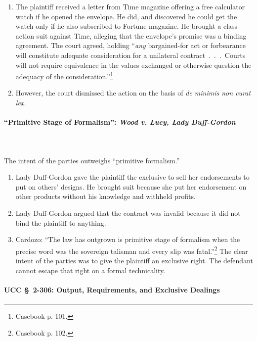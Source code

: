 \begin{enumerate}
    \item The plaintiff received a letter from Time magazine offering a free 
    calculator watch if he opened the envelope. He did, and discovered he 
    could get the watch only if he also subscribed to Fortune magazine. He 
    brought a class action suit against Time, alleging that the envelope's 
    promise was a binding agreement. The court agreed, holding ``\emph{any} 
    bargained-for act or forbearance will constitute adequate consideration 
    for a unilateral contract~.~.~.~Courts will not require equivalence in the 
    values exchanged or otherwise question the adequacy of the 
    consideration.''\footnote{Casebook p. 101.}
    \item However, the court dismissed the action on the basis of \emph{de 
    minimis non curat lex.}
\end{enumerate}

\paragraph{``Primitive Stage of Formalism'': \emph{Wood v. Lucy, Lady 
Duff-Gordon}}
~\\\\
The intent of the parties outweighs ``primitive formalism.''

\begin{enumerate}
    \item Lady Duff-Gordon gave the plaintiff the exclusive to sell her 
    endorsements to put on others' designs. He brought suit because she put 
    her endorsement on other products without his knowledge and withheld 
    profits.
    \item Lady Duff-Gordon argued that the contract was invalid because it did 
    not bind the plaintiff to anything.
    \item Cardozo: ``The law has outgrown is primitive stage of formalism when 
    the precise word was the sovereign talisman and every slip was 
    fatal.''\footnote{Casebook p. 102.} The clear intent of the parties was to 
    give the plaintiff an exclusive right. The defendant cannot escape that 
    right on a formal technicality.
\end{enumerate}

\paragraph{UCC \S\ 2-306: Output, Requirements, and Exclusive Dealings}

